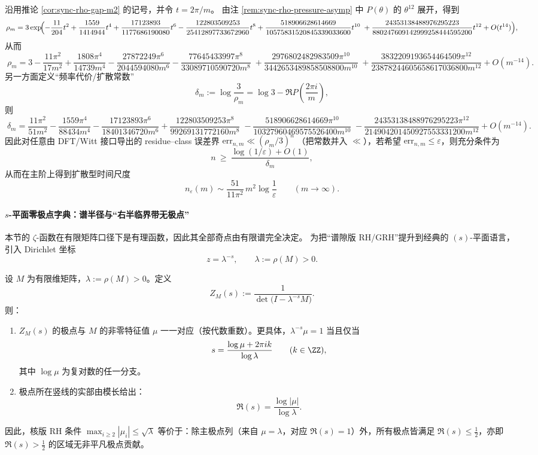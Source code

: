 \begin{corollary}\label{cor:sync-rho-gap-m8-diffusive}
沿用推论 \ref{cor:sync-rho-gap-m2} 的记号，并令 \(t=2\pi/m\)。
由注 \ref{rem:sync-rho-pressure-asymp} 中 \(P(\theta)\) 的 \(\theta^{12}\) 展开，得到
\[
\rho_m
=3\exp\!\Bigl(
-\frac{11}{204}t^2+\frac{1559}{1414944}t^4
+\frac{17123893}{1177686190080}t^6
-\frac{122803509253}{25412897733672960}t^8
+\frac{518906628614669}{10575831520845339033600}t^{10}
\;+\frac{24353138488976295223}{880247609142999258444595200}t^{12}
+O(t^{14})\Bigr),
\]
从而
\[
\boxed{\;
\rho_m
=3-\frac{11\pi^2}{17m^2}
+\frac{1808\pi^4}{14739m^4}
-\frac{27872249\pi^6}{2044594080m^6}
-\frac{77645433997\pi^8}{33089710590720m^8}
\;+\frac{2976802482983509\pi^{10}}{3442653489858508800m^{10}}
\;+\frac{3832209193654464509\pi^{12}}{23878244605658617036800m^{12}}
+O(m^{-14}).\;}
\]
另一方面定义“频率代价/扩散常数”
\[
\delta_m:=\log\frac{3}{\rho_m}=\log 3-\Re P\!\left(\frac{2\pi i}{m}\right),
\]
则
\[
\boxed{\;
\delta_m
=\frac{11\pi^2}{51m^2}
-\frac{1559\pi^4}{88434m^4}
-\frac{17123893\pi^6}{18401346720m^6}
+\frac{122803509253\pi^8}{99269131772160m^8}
\;-\frac{518906628614669\pi^{10}}{10327960469575526400m^{10}}
\;-\frac{24353138488976295223\pi^{12}}{214904201450927553331200m^{12}}
+O(m^{-14}).\;}
\]
因此对任意由 DFT/Witt 接口导出的 residue--class 误差界
\(
\mathrm{err}_{n,m}\ll (\rho_m/3)^n
\)
（把常数并入 \(\ll\)），若希望 \(\mathrm{err}_{n,m}\le \varepsilon\)，则充分条件为
\[
n\ \ge\ \frac{\log(1/\varepsilon)+O(1)}{\delta_m},
\]
从而在主阶上得到扩散型时间尺度
\[
\boxed{\;
n_\varepsilon(m)\sim \frac{51}{11\pi^2}\,m^2\log\frac{1}{\varepsilon}\qquad(m\to\infty).\;}
\]
\end{corollary}

\paragraph{\texorpdfstring{$s$}{s}-平面零极点字典：谱半径与“右半临界带无极点”}\label{par:s-plane-pole-dictionary}
本节的 \(\zeta\)-函数在有限矩阵口径下是有理函数，因此其全部奇点由有限谱完全决定。
为把“谱隙版 RH/GRH”提升到经典的 \((s)\)-平面语言，引入 Dirichlet 坐标
\[
z=\lambda^{-s},\qquad \lambda:=\rho(M)>0.
\]
\begin{remark}\label{prop:s-plane-spectrum-poles}
设 \(M\) 为有限维矩阵，\(\lambda:=\rho(M)>0\)。定义
\[
Z_M(s):=\frac{1}{\det\!\bigl(I-\lambda^{-s}M\bigr)}.
\]
则：
\begin{enumerate}
  \item \(Z_M(s)\) 的极点与 \(M\) 的非零特征值 \(\mu\) 一一对应（按代数重数）。更具体，\(\lambda^{-s}\mu=1\) 当且仅当
  \[
  s=\frac{\log\mu+2\pi i k}{\log\lambda}\qquad(k\in\ZZ),
  \]
  其中 \(\log\mu\) 为复对数的任一分支。
  \item 极点所在竖线的实部由模长给出：
  \[
  \Re(s)=\frac{\log|\mu|}{\log\lambda}.
  \]
\end{enumerate}
因此，核版 RH 条件
\(
\max_{i\ge 2}|\mu_i|\le \sqrt{\lambda}
\)
等价于：除主极点列（来自 \(\mu=\lambda\)，对应 \(\Re(s)=1\)）外，所有极点皆满足 \(\Re(s)\le \tfrac12\)，亦即 \(\Re(s)>\tfrac12\) 的区域无非平凡极点贡献。
\end{remark}

